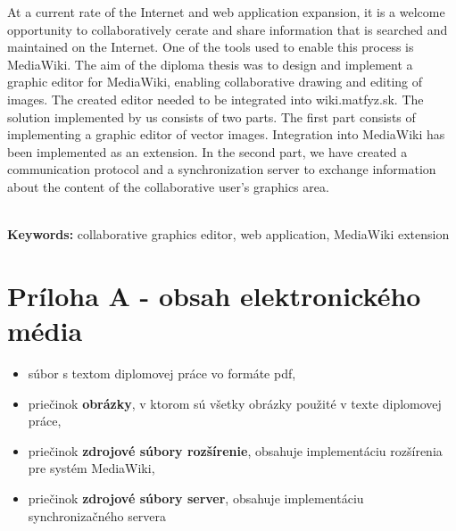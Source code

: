 \documentclass[12pt, a4paper, oneside]{book}
\begin{document}
At a current rate of the Internet and web application expansion, it is a welcome opportunity to collaboratively cerate and share information that is searched and maintained on the Internet. One of the tools used to enable this process is MediaWiki. The aim of the diploma thesis was to design and implement a graphic editor for MediaWiki, enabling collaborative drawing and editing of images. The created editor needed to be integrated into wiki.matfyz.sk. The solution implemented by us consists of two parts. The first part consists of implementing a graphic editor of vector images. Integration into MediaWiki has been implemented as an extension. In the second part, we have created a communication protocol and a synchronization server to exchange information about the content of the collaborative user's graphics area.

~\\
\textbf{Keywords:} collaborative graphics editor, web application, MediaWiki extension
\vfill\eject 


\setlength{\parskip}{0em}
\tableofcontents

\setlength{\parskip}{\spaceafterpar}


\mainmatter










\backmatter
\def\spaceafterpar{0em}
\setlength{\parskip}{\spaceafterpar}
\listoffigures

\listoftables



\nocite{*}



\chapter*{Príloha A - obsah elektronického média}
\begin{itemize}
	\item súbor s textom diplomovej práce vo formáte pdf,
	\item priečinok \textbf{obrázky}, v ktorom sú všetky obrázky použité v texte diplomovej práce,
	\item priečinok \textbf{zdrojové súbory rozšírenie}, obsahuje implementáciu rozšírenia pre systém MediaWiki,
		\item priečinok \textbf{zdrojové súbory server}, obsahuje implementáciu synchronizačného servera
\end{itemize}
\end{document}
